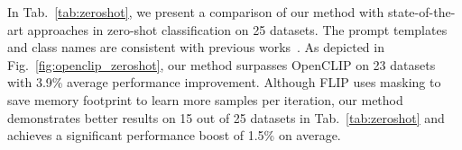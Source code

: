 In Tab.~\ref{tab:zeroshot}, we present a comparison of our method with state-of-the-art approaches in zero-shot classification on 25 datasets. The prompt templates and class names are consistent with previous works~\cite{li2023scaling}. As depicted in Fig.~\ref{fig:openclip_zeroshot}, our method surpasses OpenCLIP on 23 datasets with 3.9\% average performance improvement. Although FLIP uses masking to save memory footprint to learn more samples per iteration, our method demonstrates better results on 15 out of 25 datasets in Tab.~\ref{tab:zeroshot} and achieves a significant performance boost of 1.5\% on average.

\begin{table}[t]
    \centering
    \caption{Linear probe performance of various pre-trained models on 26 datasets. $\dag$: Results reported in CLIP paper. $\ddag$: Results we reproduced. Entries in green are the best results using LAION-400M. Here, all methods employ the same backbone of ViT-L/14.}
    \vspace{-4mm}
    \label{tab:linear-probe-big-table}
\end{table}
